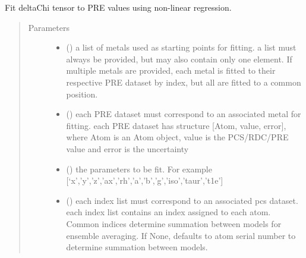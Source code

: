 \documentclass[a4paper,10pt,english]{sphinxmanual}
\begin{document}
\begin{fulllineitems}
\label{\detokenize{reference/generated/paramagpy.fit.nlr_fit_metal_from_pre:paramagpy.fit.nlr_fit_metal_from_pre}}
Fit deltaChi tensor to PRE values using non-linear regression.
\begin{quote}\begin{description}
\item[{Parameters}] \leavevmode\begin{itemize}
\item {} 
 () \textendash{} a list of metals used as starting points for fitting.
a list must always be provided, but may also contain
only one element. If multiple metals are provided, each metal
is fitted to their respective PRE dataset by index, but all are
fitted to a common position.

\item {} 
 () \textendash{} each PRE dataset must correspond to an associated metal for fitting.
each PRE dataset has structure {[}Atom, value, error{]}, where Atom is
an Atom object, value is the PCS/RDC/PRE value
and error is the uncertainty

\item {} 
 () \textendash{} the parameters to be fit.
For example {[}‘x’,’y’,’z’,’ax’,’rh’,’a’,’b’,’g’,’iso’,’taur’,’t1e’{]}

\item {} 
 (\sphinxstyleliteralemphasis{\sphinxupquote{, }}) \textendash{} each index list must correspond to an associated pcs dataset.
each index list contains an index assigned to each atom.
Common indices determine summation between models
for ensemble averaging.
If None, defaults to atom serial number to determine summation
between models.


\end{itemize}
\end{description}
\end{quote}
\end{fulllineitems}
\end{document}
